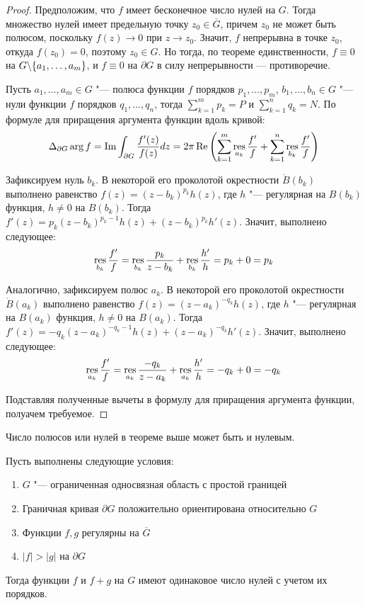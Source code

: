 \begin{proof}
	Предположим, что $f$ имеет бесконечное число нулей на $G$. Тогда множество нулей имеет предельную точку $z_0 \in \overline{G}$, причем $z_0$ не может быть полюсом, поскольку $f(z) \to 0$ при $z \to z_0$. Значит, $f$ непрерывна в точке $z_0$, откуда $f(z_0) = 0$, поэтому $z_0 \in G$. Но тогда, по теореме единственности, $f \equiv 0$ на $G \backslash \{a_1, \dotsc, a_m\}$, и $f \equiv 0$ на $\partial G$ в силу непрерывности --- противоречие.
	
	Пусть $a_1, \dotsc, a_m \in G$ "--- полюса функции $f$ порядков $p_1, \dotsc, p_m$, $b_1, \dots, b_n \in G$ "--- нули функции $f$ порядков $q_1, \dotsc, q_n$, тогда $\sum_{k = 1}^mp_k = P$ и $\sum_{k = 1}^nq_k = N$. По формуле для приращения аргумента функции вдоль кривой:
	\[\Delta_{\partial G} \arg f = \operatorname{Im}\int_{\partial G}\frac{f'(z)}{f(z)}dz = 2\pi\operatorname{Re} \left(\sum_{k = 1}^m\operatorname*{res}_{a_k}\frac{f'}{f} + \sum_{k = 1}^n\operatorname*{res}_{b_k}\frac{f'}{f}\right)\]
	
	Зафиксируем нуль $b_k$. В некоторой его проколотой окрестности $\mathring B(b_k)$ выполнено равенство $f(z) = (z-b_k)^{p_k}h(z)$, где $h$ "--- регулярная на $B(b_k)$ функция, $h \ne 0$ на $B(b_k)$. Тогда $f'(z) = p_k(z-b_k)^{p_k - 1}h(z) + (z-b_k)^{p_k}h'(z)$. Значит, выполнено следующее:
	\[\operatorname*{res}_{b_k}\frac{f'}{f} = \operatorname*{res}_{b_k}\frac{p_k}{z-b_k} + \operatorname*{res}_{b_k}\frac{h'}{h} = p_k + 0 = p_k\]
	
	Аналогично, зафиксируем полюс $a_k$. В некоторой его проколотой окрестности $\mathring B(a_k)$ выполнено равенство $f(z) = (z-a_k)^{-q_k}h(z)$, где $h$ "--- регулярная на $B(a_k)$ функция, $h \ne 0$ на $B(a_k)$. Тогда $f'(z) = -q_k(z-a_k)^{-q_k - 1}h(z) + (z-a_k)^{-q_k}h'(z)$. Значит, выполнено следующее:
	\[\operatorname*{res}_{a_k}\frac{f'}{f} = \operatorname*{res}_{a_k}\frac{-q_k}{z-a_k} + \operatorname*{res}_{a_k}\frac{h'}{h} = -q_k + 0 = -q_k\]
	
	Подставляя полученные вычеты в формулу для приращения аргумента функции, полуачем требуемое.
\end{proof}

\begin{note}
	Число полюсов или нулей в теореме выше может быть и нулевым.
\end{note}

\begin{theorem}[Руше]
	Пусть выполнены следующие условия:
	\begin{enumerate}
		\item $G$ "--- ограниченная односвязная область с простой границей
		
		\item Граничная кривая $\partial G$ положительно ориентирована относительно $G$
		
		\item Функции $f, g$ регулярны на $\overline{G}$
		
		\item $|f| > |g|$ на $\partial G$
	\end{enumerate}
	
	Тогда функции $f$ и $f+g$ на $G$ имеют одинаковое число нулей с учетом их порядков.
\end{theorem}

